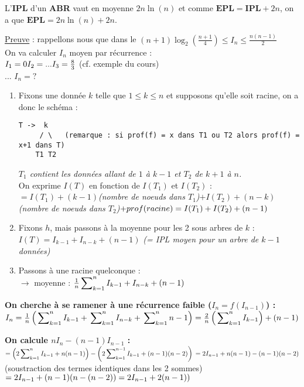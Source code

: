 \documentclass{article}
\newcommand{\sumkn}[3]{\sideset{}{_{k=#1}^{#2}}\sum{#3}}
\begin{document}
\noindent L'\textbf{IPL} d'un \textbf{ABR} vaut en moyenne $2n\ln{(n)}$ et comme $\mathbf{EPL} = 
\mathbf{IPL}+2n$, on a que $\mathbf{EPL} = 2n\ln{(n)}+2n$.

\noindent\underline{Preuve} : rappellons nous que dans le $ (n+1) \log_2{(\frac{n+1}{4})}\leq I_n \leq 
\frac{n(n-1)}{2}$ \\
On va calculer $I_n$ moyen par récurrence : \\
$I_1 = 0\\
I_2 = ...
I_3 = \frac{8}{3}$ (cf. exemple du cours) \\
...
$I_n = ?$ \\
\begin{enumerate}
\item Fixons une donnée $k$ telle que $1 \leq k \leq n$ et supposons qu'elle soit racine, on a donc le schéma :
\begin{lstlisting}
T ->  k
     / \   (remarque : si prof(f) = x dans T1 ou T2 alors prof(f) = x+1 dans T)
    T1 T2
\end{lstlisting}
\textit{$T_1$ contient les données allant de $1$ à $k-1$ et $T_2$ de $k+1$ à $n$.} \\
On exprime $I(T)$ en fonction de $I(T_1)$ et $I(T_2)$ : \\
$ = I(T_1)+(k-1)$\textit{(nombre de noeuds dans $T_1$)}$+I(T_2)+(n-k)$\textit{(nombre de noeuds dans 
$T_2$)}$+prof(racine) \\ = I(T_1)+I(T_2)+(n-1)$

\item Fixons $h$, mais passons à la moyenne pour les 2 sous arbres de $k$ : \\
$I(T) = I_{k-1} + I_{n-k} + (n-1)$ \textit{(= IPL moyen pour un arbre de $k-1$ données)}

\item Passons à une racine quelconque : \\
$\rightarrow$ moyenne : $\frac{1}{n} \sumkn{1}{n}{I_{k-1}+I_{n-k}+(n-1)}$

\end{enumerate}

\noindent\textbf{On cherche à se ramener à une récurrence faible ($I_n = f(I_{n-1})$) :} \\
$I_n = \frac{1}{n}\left(\sumkn{1}{n}{I_{k-1}} + \sumkn{1}{n}{I_{n-k}} + \sumkn{1}{n}{n-1}\right) 
= \frac{2}{n}\left(\sumkn{1}{n}{I_{k-1}}\right) + (n-1) \\$

\noindent\textbf{On calcule $nI_n-(n-1)I_{n-1}$ :} \\
$= \left(2\sumkn{1}{n}{I_{k-1}} + n(n-1)\right) - \left(2\sumkn{1}{n-1}{I_{k-1}} + (n-1)(n-2)\right) \\
= 2 I_{n-1} + n(n-1)-(n-1)(n-2)$ (soustraction des termes identiques dans les 2 sommes) \\
$ = 2 I_{n-1} + (n-1) (n-(n-2)) \\
= 2 I_{n-1} + 2(n-1)) \\$
\end{document}
